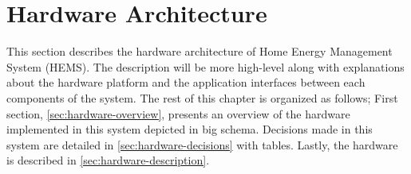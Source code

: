 \chapter{Hardware Architecture}
\label{ch:hardware}
This section describes the hardware architecture of Home Energy Management System (HEMS). The description will be more high-level along with explanations about the hardware platform and the application interfaces between each components of the system. The rest of this chapter is organized as follows; First section, \autoref{sec:hardware-overview}, presents an overview of the hardware implemented in this system depicted in big schema. Decisions made in this system are detailed in \autoref{sec:hardware-decisions} with tables. Lastly, the hardware is described in \autoref{sec:hardware-description}.





